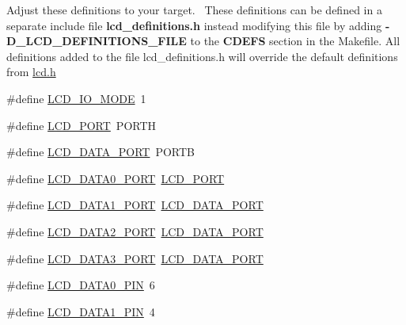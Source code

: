 Adjust these definitions to your target.~\newline
 These definitions can be defined in a separate include file {\bfseries{lcd\+\_\+definitions.\+h}} instead modifying this file by adding {\bfseries{-\/D\+\_\+\+L\+C\+D\+\_\+\+D\+E\+F\+I\+N\+I\+T\+I\+O\+N\+S\+\_\+\+F\+I\+LE}} to the {\bfseries{C\+D\+E\+FS}} section in the Makefile. All definitions added to the file lcd\+\_\+definitions.\+h will override the default definitions from \mbox{\hyperlink{lcd_8h}{lcd.\+h}} \begin{DoxyCompactItemize}
\item 
\#define \mbox{\hyperlink{group__pfleury__lcd_ga659fcdf979f69bbd14f852f525f25e02}{L\+C\+D\+\_\+\+I\+O\+\_\+\+M\+O\+DE}}~1
\item 
\#define \mbox{\hyperlink{group__pfleury__lcd_gabcf42bd88b3c36193f301ca25b033875}{L\+C\+D\+\_\+\+P\+O\+RT}}~P\+O\+R\+TH
\item 
\#define \mbox{\hyperlink{group__pfleury__lcd_ga077def6ebb43bf9aee4e7cad468ed726}{L\+C\+D\+\_\+\+D\+A\+T\+A\+\_\+\+P\+O\+RT}}~P\+O\+R\+TB
\item 
\#define \mbox{\hyperlink{group__pfleury__lcd_gafc0acd4774bcd311595732f5367e266b}{L\+C\+D\+\_\+\+D\+A\+T\+A0\+\_\+\+P\+O\+RT}}~\mbox{\hyperlink{group__pfleury__lcd_gabcf42bd88b3c36193f301ca25b033875}{L\+C\+D\+\_\+\+P\+O\+RT}}
\item 
\#define \mbox{\hyperlink{group__pfleury__lcd_ga345af0248d5739bd8896d4f585618ca2}{L\+C\+D\+\_\+\+D\+A\+T\+A1\+\_\+\+P\+O\+RT}}~\mbox{\hyperlink{group__pfleury__lcd_ga077def6ebb43bf9aee4e7cad468ed726}{L\+C\+D\+\_\+\+D\+A\+T\+A\+\_\+\+P\+O\+RT}}
\item 
\#define \mbox{\hyperlink{group__pfleury__lcd_ga4d5c48a3f2b9426c14bbca3150834a20}{L\+C\+D\+\_\+\+D\+A\+T\+A2\+\_\+\+P\+O\+RT}}~\mbox{\hyperlink{group__pfleury__lcd_ga077def6ebb43bf9aee4e7cad468ed726}{L\+C\+D\+\_\+\+D\+A\+T\+A\+\_\+\+P\+O\+RT}}
\item 
\#define \mbox{\hyperlink{group__pfleury__lcd_gaec71b6692f2af7c9de32dbe85fcb51c2}{L\+C\+D\+\_\+\+D\+A\+T\+A3\+\_\+\+P\+O\+RT}}~\mbox{\hyperlink{group__pfleury__lcd_ga077def6ebb43bf9aee4e7cad468ed726}{L\+C\+D\+\_\+\+D\+A\+T\+A\+\_\+\+P\+O\+RT}}
\item 
\#define \mbox{\hyperlink{group__pfleury__lcd_gafe54d7d886b5c56bed0cf971febbb773}{L\+C\+D\+\_\+\+D\+A\+T\+A0\+\_\+\+P\+IN}}~6
\item 
\#define \mbox{\hyperlink{group__pfleury__lcd_ga97fb520e7b83bb047ac5c9247de57049}{L\+C\+D\+\_\+\+D\+A\+T\+A1\+\_\+\+P\+IN}}~4
\item 

\end{DoxyCompactItemize}
